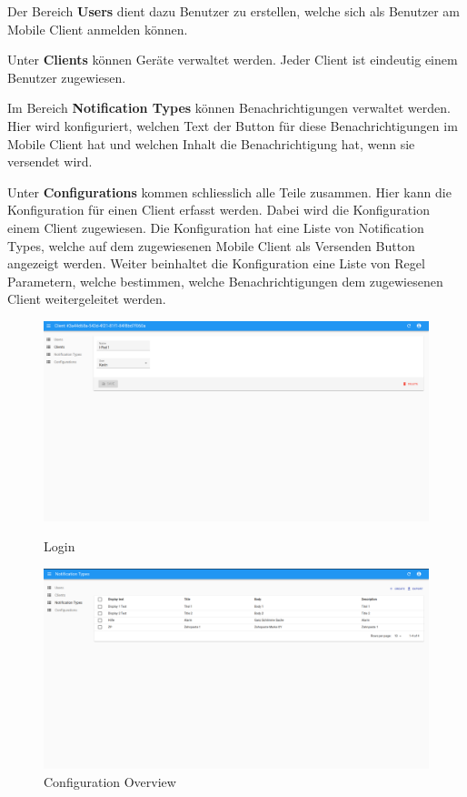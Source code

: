 Der Bereich \textbf{Users} dient dazu Benutzer zu erstellen, welche sich als Benutzer am Mobile Client anmelden können.

Unter \textbf{Clients} können Geräte verwaltet werden.
Jeder Client ist eindeutig einem Benutzer zugewiesen.

Im Bereich \textbf{Notification Types} können Benachrichtigungen verwaltet werden.
Hier wird konfiguriert, welchen Text der Button für diese Benachrichtigungen im Mobile Client hat und welchen Inhalt die Benachrichtigung hat, wenn sie versendet wird.

Unter \textbf{Configurations} kommen schliesslich alle Teile zusammen.
Hier kann die Konfiguration für einen Client erfasst werden.
Dabei wird die Konfiguration einem Client zugewiesen.
Die Konfiguration hat eine Liste von Notification Types, welche auf dem zugewiesenen Mobile Client als Versenden Button angezeigt werden.
Weiter beinhaltet die Konfiguration eine Liste von Regel Parametern, welche bestimmen, welche Benachrichtigungen dem zugewiesenen Client weitergeleitet werden.


\begin{figure}[h]
    \centering
    \begin{minipage}[b]{0.4\textwidth}
        \includegraphics[width=\textwidth]{graphics/screenshots/adminui/configuration}
        \caption{Login}
    \end{minipage}
    \hfill
    \begin{minipage}[b]{0.4\textwidth}
        \includegraphics[width=\textwidth]{graphics/screenshots/adminui/notification-type}
        \caption{Configuration Overview}
    \end{minipage}
    \label{fig:AdminUI-Screens2}
\end{figure}

